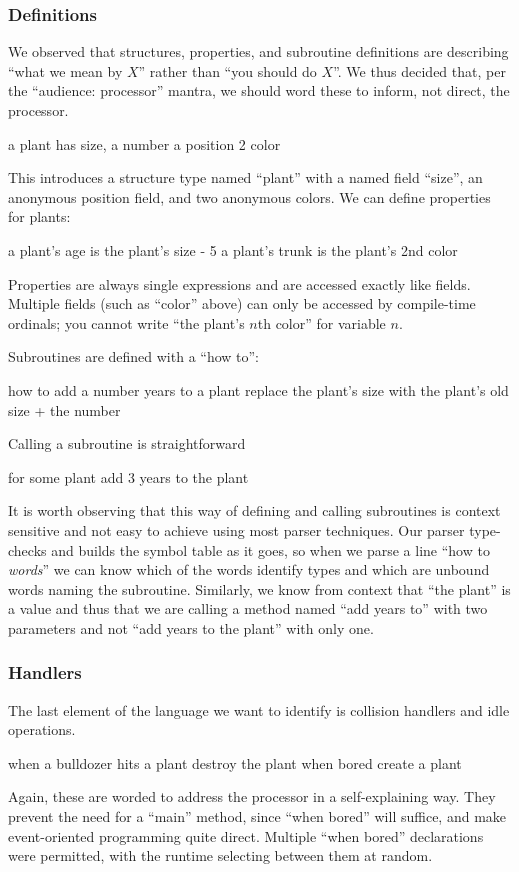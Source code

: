 \documentclass{sig-alternate}
\newcommand{\INDSTATE}[1][1]{\STATE\hspace{#1\algorithmicindent}}
\newenvironment{snippet}{\begin{algorithmic}[1]}{\end{algorithmic}}
\begin{document}
\subsubsection{Definitions}
We observed that structures, properties, and subroutine definitions
are describing ``what we mean by $X$'' rather than ``you should do $X$''.
We thus decided that, per the ``audience: processor'' mantra, 
we should word these to inform, not direct, the processor.

\begin{snippet}
\STATE a plant has
\INDSTATE size, a number
\INDSTATE a position
\INDSTATE 2 color
\end{snippet}
This introduces a structure type named ``plant''
with a named field ``size'', an anonymous position field, and two anonymous colors.
We can define properties for plants:
\begin{snippet}
\STATE a plant's age is the plant's size - 5
\STATE a plant's trunk is the plant's 2nd color
\end{snippet}
Properties are always single expressions and are accessed exactly like fields.
Multiple fields (such as ``color'' above) can only be accessed by compile-time ordinals;
you cannot write ``the plant's $n$th color'' for variable $n$.

Subroutines are defined with a ``how to'':
\begin{snippet}
\STATE how to add a number years to a plant
\INDSTATE replace the plant's size with the plant's old size + the number
\end{snippet}
Calling a subroutine is straightforward
\begin{snippet}
\STATE for some plant
\INDSTATE add 3 years to the plant
\end{snippet}
It is worth observing that this way of defining and calling subroutines
is context sensitive and not easy to achieve using most parser techniques.
Our parser type-checks and builds the symbol table as it goes,
so when we parse a line ``how to \emph{words}''
we can know which of the words identify types and which are unbound words naming the subroutine.
Similarly, we know from context that ``the plant'' is a value
and thus that we are calling a method named ``add years to'' with two parameters
and not ``add years to the plant'' with only one.

\subsubsection{Handlers}
The last element of the language we want to identify
is collision handlers and idle operations.
\begin{snippet}
\STATE when a bulldozer hits a plant
\INDSTATE destroy the plant
\STATE when bored
\INDSTATE create a plant
\end{snippet}
Again, these are worded to address the processor in a self-explaining way.
They prevent the need for a ``main'' method, since ``when bored'' will suffice,
and make event-oriented programming quite direct.
Multiple ``when bored'' declarations were permitted,
with the runtime selecting between them at random.
\end{document}

